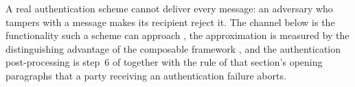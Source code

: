 
A real authentication scheme cannot deliver every message: an adversary who
tampers with a message makes its recipient reject it. The channel below is
the functionality such a scheme can approach
\cite[Sec.~5, Eqs.~(37)--(38)]{tupkary2026decoy}, the approximation is
measured by the distinguishing advantage of the composable framework
\cite[Sec.~II.E, Def.~1; Sec.~VII.A, Eq.~(36)]{portmann2022security}, and
the authentication post-processing is step~6 of
\cite[Sec.~4.1, Protocol~1]{tupkary2026decoy} together with the rule of
that section's opening paragraphs that a party receiving an authentication
failure aborts.

